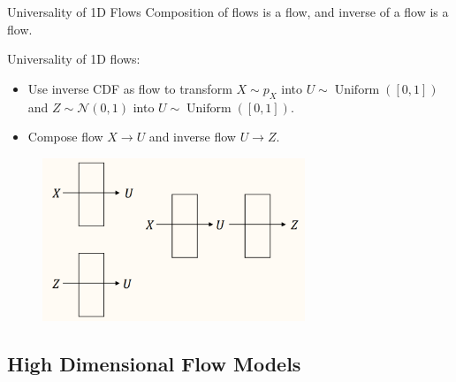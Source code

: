 \begin{frame}[allowframebreaks]

\begin{myconceptblock}{10.13}{Universality of 1D Flows}
    Composition of flows is a flow, and inverse of a flow is a flow.

    Universality of 1D flows:

    \begin{itemize}
        \item Use inverse CDF as flow to transform $X \sim p_{X}$ into $U \sim \operatorname{Uniform}([0,1])$ and $Z \sim \mathcal{N}(0,1)$ into $U \sim \operatorname{Uniform}([0,1])$.
        \item Compose flow $X \rightarrow U$ and inverse flow $U \rightarrow Z$.
    \end{itemize}

    \begin{figure}[H]
        \centering
        \includegraphics[width=0.7\textwidth]{.././assets/10.11.png}
    \end{figure}
\end{myconceptblock}

\end{frame}

\subsection{High Dimensional Flow Models}

